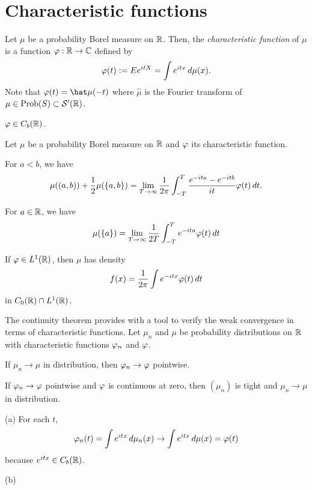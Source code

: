\documentclass{../../large}
\begin{document}
\begin{prb}
\end{prb}


\begin{prb}
\end{prb}


\begin{prb}
\end{prb}


\section{Characteristic functions}

\begin{prb}
Let $\mu$ be a probability Borel measure on $\mathbb{R}$.
Then, the \emph{characteristic function} of $\mu$ is a function $\varphi:\mathbb{R}\to\mathbb{C}$ defined by
\[\varphi(t):=Ee^{itX}=\int e^{itx}\,d\mu(x).\]
Note that $\f(t)=\hat\mu(-t)$ where $\hat\mu$ is the Fourier transform of $\mu\in\operatorname{Prob}(S)\subset\mathcal{S}'(\mathbb{R})$.
\begin{parts}
\item $\varphi\in C_b(\mathbb{R})$.
\end{parts}
\end{prb}

\begin{prb}
Let $\mu$ be a probability Borel measure on $\mathbb{R}$ and $\varphi$ its characteristic function.
\begin{parts}
\item For $a<b$, we have
\[\mu((a,b))+\frac12\mu(\{a,b\})=\lim_{T\to\infty}\frac1{2\pi}\int_{-T}^T\frac{e^{-ita}-e^{-itb}}{it}\varphi(t)\,dt.\]
\item For $a\in\mathbb{R}$, we have
\[\mu(\{a\})=\lim_{T\to\infty}\frac1{2T}\int_{-T}^Te^{-ita}\varphi(t)\,dt\]
\item If $\varphi\in L^1(\mathbb{R})$, then $\mu$ has density
\[f(x)=\frac1{2\pi}\int e^{-itx}\varphi(t)\,dt\]
in $C_0(\mathbb{R})\cap L^1(\mathbb{R})$.
\end{parts}
\end{prb}

\begin{prb}
The continuity theorem provides with a tool to verify the weak convergence in terms of characteristic functions.
Let $\mu_n$ and $\mu$ be probability distributions on $\mathbb{R}$ with characteristic functions $\varphi_n$ and $\varphi$.
\begin{parts}
\item If $\mu_n\to\mu$ in distribution, then $\varphi_n\to\varphi$ pointwise.
\item If $\varphi_n\to\varphi$ pointwise and $\varphi$ is continuous at zero, then $(\mu_n)$ is tight and $\mu_n\to\mu$ in distribution.
\end{parts}
\end{prb}
\begin{pf}
(a)
For each $t$,
\[\varphi_n(t)=\int e^{itx}\,d\mu_n(x)\to\int e^{itx}\,d\mu(x)=\varphi(t)\]
because $e^{itx}\in C_b(\mathbb{R})$.

(b)


\end{pf}
\end{document}
